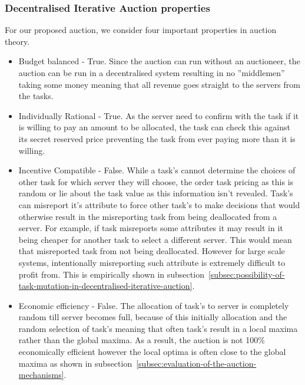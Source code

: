 \subsubsection{Decentralised Iterative Auction properties}
\label{subsubsec:decentralised-iterative-auction-properties}
For our proposed auction, we consider four important properties in auction theory.
\begin{itemize}
    \item Budget balanced - True. Since the auction can run without an auctioneer, the auction can be run in a
        decentralised system resulting in no ''middlemen'' taking some money meaning that all revenue goes straight to
        the servers from the tasks.
    \item Individually Rational - True. As the server need to confirm with the task if it is willing to pay an amount
        to be allocated, the task can check this against its secret reserved price preventing the task from ever paying
        more than it is willing.
    \item Incentive Compatible - False. While a task's cannot determine the choices of other task for which server they
        will choose, the order task pricing as this is random or lie about the task value as this information isn't
        revealed. Task's can misreport it's attribute to force other task's to make decisions that would otherwise
        result in the misreporting task from being deallocated from a server. For example, if task misreports some
        attributes it may result in it being cheaper for another task to select a different server. This would mean
        that misreported task from not being deallocated. However for large scale systems, intentionally misreporting
        such attribute is extremely difficult to profit from. This is empirically shown in
        subsection~\ref{subsec:possibility-of-task-mutation-in-decentralised-iterative-auction}.
    \item Economic efficiency - False. The allocation of task's to server is completely random till server becomes full,
        because of this initially allocation and the random selection of task's meaning that often task's result in a
        local maxima rather than the global maxima. As a result, the auction is not 100\% economically efficient
        however the local optima is often close to the global maxima as shown in
        subsection~\ref{subsec:evaluation-of-the-auction-mechanisms}.
\end{itemize}

